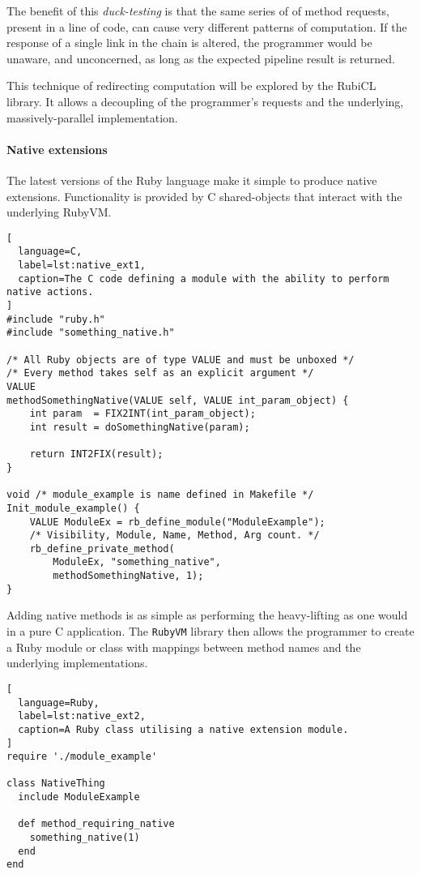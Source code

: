 The benefit of this \emph{duck-testing} is that the same series of of method requests, present in a line of code, can cause very different patterns of computation. If the response of a single link in the chain is altered, the programmer would be unaware, and unconcerned, as long as the expected pipeline result is returned.

This technique of redirecting computation will be explored by the RubiCL library. It allows a decoupling of the programmer's requests and the underlying, massively-parallel implementation.

\paragraph*{Native extensions}
The latest versions of the Ruby language make it simple to produce native extensions. Functionality is provided by C shared-objects that interact with the underlying \ac{RubyVM}.

\begin{lstlisting}[
  language=C,
  label=lst:native_ext1,
  caption=The C code defining a module with the ability to perform native actions.
]
#include "ruby.h"
#include "something_native.h"

/* All Ruby objects are of type VALUE and must be unboxed */
/* Every method takes self as an explicit argument */
VALUE
methodSomethingNative(VALUE self, VALUE int_param_object) {
    int param  = FIX2INT(int_param_object);
    int result = doSomethingNative(param);

    return INT2FIX(result);
}

void /* module_example is name defined in Makefile */
Init_module_example() {
    VALUE ModuleEx = rb_define_module("ModuleExample");
    /* Visibility, Module, Name, Method, Arg count. */
    rb_define_private_method(
        ModuleEx, "something_native",
        methodSomethingNative, 1);
}
\end{lstlisting}

Adding native methods is as simple as performing the heavy-lifting as one would in a pure C application. The \verb|RubyVM| library then allows the programmer to create a Ruby module or class with mappings between method names and the underlying implementations.

\begin{lstlisting}[
  language=Ruby,
  label=lst:native_ext2,
  caption=A Ruby class utilising a native extension module.
]
require './module_example'

class NativeThing
  include ModuleExample

  def method_requiring_native
    something_native(1)
  end
end
\end{lstlisting}

